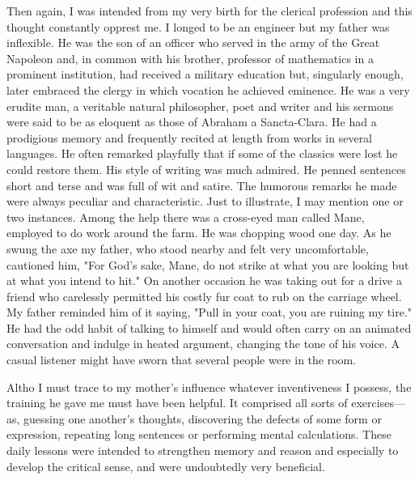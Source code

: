 \documentclass[a4paper,12pt,english,twoside,openright]{memoir}
\begin{document}
	Then again, I was intended from my very birth for the clerical profession and this thought 
	constantly opprest me.  I longed to be an engineer but my father was inflexible.  He was the son 
	of an officer who served in the army of the Great Napoleon and, in common with his brother, 
	professor of mathematics in a prominent institution, had received a military education but, 
	singularly enough, later embraced the clergy in which vocation he achieved eminence.  He was a 
	very erudite man, a veritable natural philosopher, poet and writer and his sermons were said to 
	be as eloquent as those of Abraham a Sancta-Clara.  He had a prodigious memory and 
	frequently recited at length from works in several languages.  He often remarked playfully that if 
	some of the classics were lost he could restore them.  His style of writing was much admired.  He 
	penned sentences short and terse and was full of wit and satire.  The humorous remarks he 
	made were always peculiar and characteristic.  Just to illustrate, I may mention one or two 
	instances.  Among the help there was a cross-eyed man called Mane, employed to do work 
	around the farm.  He was chopping wood one day.  As he swung the axe my father, who stood 
	nearby and felt very uncomfortable, cautioned him, "For God's sake, Mane, do not strike at what 
	you are looking but at what you intend to hit." On another occasion he was taking out for a drive a 
	friend who carelessly permitted his costly fur coat to rub on the carriage wheel.  My father 
	reminded him of it saying, "Pull in your coat, you are ruining my tire." He had the odd habit of 
	talking to himself and would often carry on an animated conversation and indulge in heated 
	argument, changing the tone of his voice.  A casual listener might have sworn that several people 
	were in the room.  
	
	Altho I must trace to my mother's influence whatever inventiveness I possess, the training he 
	gave me must have been helpful.  It comprised all sorts of exercises—as, guessing one another's 
	thoughts, discovering the defects of some form or expression, repeating long sentences or 
	performing mental calculations.  These daily lessons were intended to strengthen memory and 
	reason and especially to develop the critical sense, and were undoubtedly very beneficial.  
\end{document}
